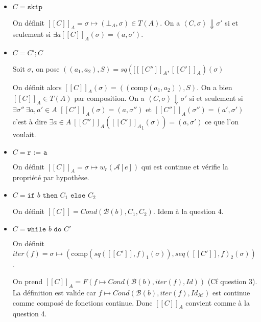 \documentclass{article}
\newcommand{\M}{\mathcal{M}}
\newcommand{\Cr}[1]{[\![#1]\!]}
\newcommand{\Co}[1]{\left \langle #1 \right \rangle}
\newcommand{\comp}{\text{comp}}
\begin{document}
\begin{itemize}
    \item $C = \texttt{skip}$
    
    On définit $\Cr{C}_A = \sigma \mapsto \left (\bot_A, \sigma\right ) \in T\left (A\right )$. On a $\Co{C, \sigma} \Downarrow \sigma'$ si et seulement si $\exists a \Cr{C}_A\left (\sigma\right ) = \left (a, \sigma'\right )$.
    
    \item $C = C' ; C$
    
    Soit $\sigma$, on pose $ \left (\left (a_1,a_2\right ),S\right )=sq\left ([\Cr{C''}_A,\Cr{C'}_A\right )\left (\sigma\right )$ 
    
    On définit alors $\Cr{C}_A\left (\sigma\right ) =\left ( \left (\comp\left (a_1,a_2\right )\right ), S\right )$. On a bien $\Cr{C}_A \in T\left (A\right )$ par composition. 
    On a $\Co{C, \sigma} \Downarrow \sigma'$ si et seulement si  $\exists \sigma'' \: \exists a, a' \in A$ $\Cr{C'}_A\left (\sigma\right ) = \left (a, \sigma''\right )$ et $\Cr{C''}_A\left (\sigma''\right ) = \left (a', \sigma'\right )$ c'est à dire $\exists a \in A \: \Cr{C''}_A\left ({\Cr{C'}_A}_1\left (\sigma\right )\right ) = \left (a, \sigma'\right )$ ce que l'on voulait.
    
    \item $C = \texttt{r := a}$
    
     On définit $\Cr{C}_A = \sigma \mapsto w_r\left (\mathcal{A}[e]\right )$ qui est continue et vérifie la propriété par hypothèse.
    
    \item $C = \texttt{if } b \texttt{ then } C_1 \texttt{ else } C_2$

        On définit $\Cr{C} = Cond\left (\mathcal{B}\left (b\right ), C_1, C_2\right )$. Idem à la question 4.
    
    \item $C = \texttt{while } b \texttt{ do } C'$
    
    On définit  $iter\left (f\right ) = \sigma \mapsto \left (\comp\left (sq\left (\Cr{C'}, f\right )_1\left (\sigma\right )\right ), seq\left (\Cr{C'}, f\right )_2\left (\sigma\right )\right )$.
     
     On prend $\Cr{C}_A = F\left (f \mapsto Cond\left (\mathcal{B}\left (b\right ), iter\left (f\right ), Id\right )\right )$ (Cf question 3). La définition est valide car $f \mapsto Cond\left (\mathcal{B}\left (b\right ), iter\left (f\right ), Id_\M\right )$ est continue comme composé de fonctions continue. Donc $\Cr{C}_A$ convient comme à la question 4.
\end{itemize}
\end{document}
